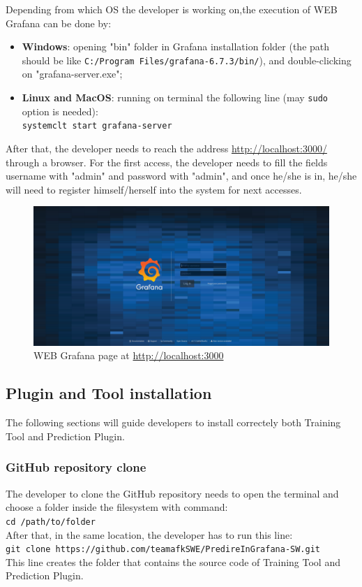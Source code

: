 Depending from which OS the developer is working on,the execution of WEB Grafana can be done by:
\begin{itemize}
\item \textbf{Windows}: opening "bin" folder in Grafana installation folder
(the path should be like \texttt{C:/Program Files/grafana-6.7.3/bin/}), and double-clicking on "grafana-server.exe";
\item \textbf{Linux and MacOS}: running on terminal the following line (may \texttt{sudo} option is needed):\\
\texttt{systemclt start grafana-server}\\
\end{itemize} 
After that, the developer needs to reach the address \url{http://localhost:3000/} through a browser. For the first access, the developer needs to fill the fields username with "admin" and password with "admin", and once he/she is in, he/she will need to register himself/herself into the system for next accesses.

\begin{figure}[H]
\centering
\includegraphics[scale=0.25]{./img/web_grafana_login.png}
\caption{WEB Grafana page at \url{http://localhost:3000}}
\end{figure}
\subsection{Plugin and Tool installation}
The following sections will guide developers to install correctely both Training Tool and Prediction Plugin.
\subsubsection{GitHub repository clone}
The developer to clone the GitHub repository needs to open the terminal and choose a folder inside the filesystem with command: \\
\texttt{cd /path/to/folder}\\
After that, in the same location, the developer has to run  this line:\\
\texttt{git clone https://github.com/teamafkSWE/PredireInGrafana-SW.git}\\
This line creates the folder that contains the source code of Training Tool and Prediction Plugin.\mbox \\

